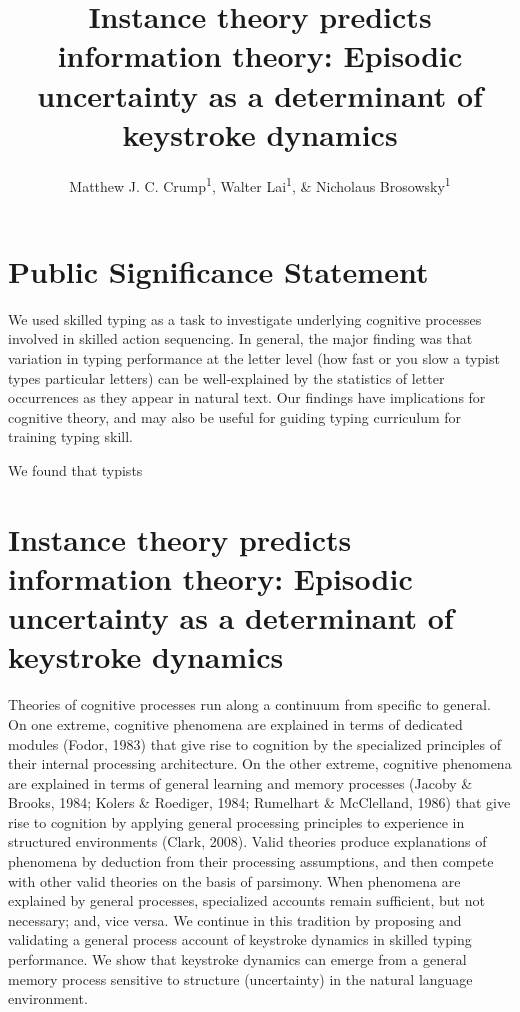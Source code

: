 \documentclass[,man,donotrepeattitle,floatsintext]{apa6}
\title{Instance theory predicts information theory: Episodic uncertainty as a determinant of keystroke dynamics}
\author{Matthew J. C. Crump\textsuperscript{1}, Walter Lai\textsuperscript{1}, \& Nicholaus Brosowsky\textsuperscript{1}}
\date{}
\affiliation{
\vspace{0.5cm}
\textsuperscript{1} Brooklyn College of the City University of New York}
\begin{document}
\maketitle

\hypertarget{public-significance-statement}{%
\section{Public Significance Statement}\label{public-significance-statement}}

We used skilled typing as a task to investigate underlying cognitive processes involved in skilled action sequencing. In general, the major finding was that variation in typing performance at the letter level (how fast or you slow a typist types particular letters) can be well-explained by the statistics of letter occurrences as they appear in natural text. Our findings have implications for cognitive theory, and may also be useful for guiding typing curriculum for training typing skill.

We found that typists

\hypertarget{instance-theory-predicts-information-theory-episodic-uncertainty-as-a-determinant-of-keystroke-dynamics}{%
\section{Instance theory predicts information theory: Episodic uncertainty as a determinant of keystroke dynamics}\label{instance-theory-predicts-information-theory-episodic-uncertainty-as-a-determinant-of-keystroke-dynamics}}

Theories of cognitive processes run along a continuum from specific to general. On one extreme, cognitive phenomena are explained in terms of dedicated modules (Fodor, 1983) that give rise to cognition by the specialized principles of their internal processing architecture. On the other extreme, cognitive phenomena are explained in terms of general learning and memory processes (Jacoby \& Brooks, 1984; Kolers \& Roediger, 1984; Rumelhart \& McClelland, 1986) that give rise to cognition by applying general processing principles to experience in structured environments (Clark, 2008). Valid theories produce explanations of phenomena by deduction from their processing assumptions, and then compete with other valid theories on the basis of parsimony. When phenomena are explained by general processes, specialized accounts remain sufficient, but not necessary; and, vice versa. We continue in this tradition by proposing and validating a general process account of keystroke dynamics in skilled typing performance. We show that keystroke dynamics can emerge from a general memory process sensitive to structure (uncertainty) in the natural language environment.
\end{document}
